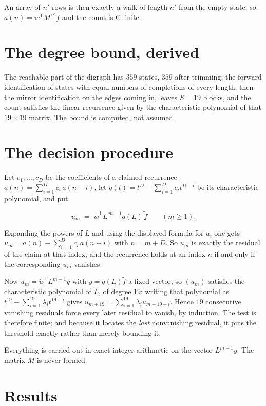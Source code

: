 \documentclass[11pt]{article}
\theoremstyle{definition}
\begin{document}
An array of $n'$ rows is then exactly a walk of length $n'$ from the empty state, so $a(n) = w^{\mathsf T}M^{\,n'}f$ and the count is C-finite.

\section{The degree bound, derived}

The reachable part of the digraph has $359$ states, $359$ after trimming; the forward identification of states with equal numbers of completions of every length, then the mirror identification on the edges coming in, leaves $S = 19$ blocks, and the count satisfies the linear recurrence given by the characteristic polynomial of that $19\times19$ matrix. The bound is computed, not assumed.

\section{The decision procedure}

Let $c_1,\dots,c_D$ be the coefficients of a claimed recurrence $a(n) = \sum_{i=1}^{D} c_i\,a(n-i)$, let $q(t) = t^{D} - \sum_{i=1}^{D} c_i t^{D-i}$ be its characteristic polynomial, and put

\[u_m \;=\; \tilde w^{\mathsf T} L^{\,m-1} q(L)\,\tilde f \qquad (m \ge 1).\]

Expanding the powers of $L$ and using the displayed formula for $a$, one gets $u_m = a(n) - \sum_{i=1}^{D} c_i\,a(n-i)$ with $n = m + D$. So $u_m$ is exactly the residual of the claim at that index, and the recurrence holds at an index $n$ if and only if the corresponding $u_m$ vanishes.

Now $u_m = \tilde w^{\mathsf T} L^{m-1} y$ with $y = q(L)\tilde f$ a fixed vector, so $(u_m)$ satisfies the characteristic polynomial of $L$, of degree $19$: writing that polynomial as $t^{19} - \sum_{i=1}^{19} \lambda_i t^{19-i}$ gives $u_{m+19} = \sum_{i=1}^{19} \lambda_i u_{m+19-i}$. Hence $19$ consecutive vanishing residuals force every later residual to vanish, by induction. The test is therefore finite; and because it locates the {\itshape last} nonvanishing residual, it pins the threshold exactly rather than merely bounding it.

Everything is carried out in exact integer arithmetic on the vector $L^{m-1}y$. The matrix $M$ is never formed.

\section{Results}
\end{document}
